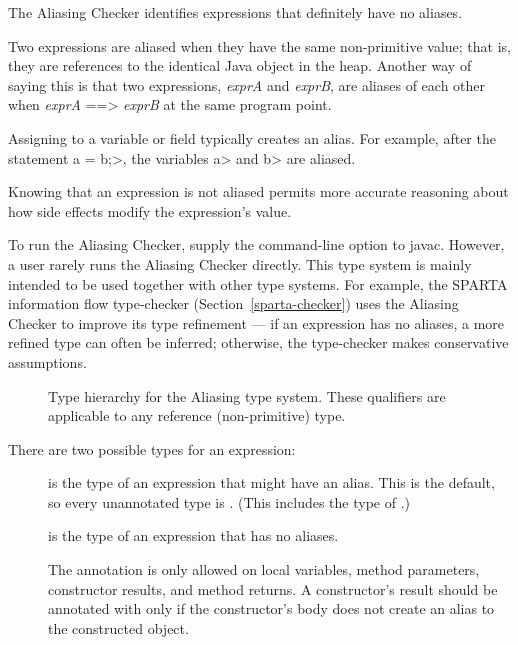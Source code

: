
The Aliasing Checker identifies expressions that definitely have no
aliases.

Two expressions are aliased when they have the same non-primitive value;
that is, they are references to the identical Java object
in the heap. Another way of saying this is that two expressions,
\textit{exprA} and \textit{exprB}, are aliases of each other when
\textit{exprA} \<==> \textit{exprB} at the same program point.

Assigning to a variable or field typically creates an alias.  For example,
after the statement \<a = b;>, the variables \<a> and \<b> are aliased.

Knowing that an expression is not aliased permits more accurate reasoning
about how side effects modify the expression's value.

To run the Aliasing Checker, supply the
command-line option to javac.
However, a user rarely runs the Aliasing Checker directly.
This type system is mainly intended to be used together with other type systems.
For example, the SPARTA information flow type-checker
(Section~\ref{sparta-checker}) uses the Aliasing Checker to improve its
type refinement --- if an expression has no aliases, a more refined type
can often be inferred; otherwise, the type-checker makes conservative
assumptions.


\begin{figure}
\caption{Type hierarchy for the Aliasing type system.
  These qualifiers are applicable to any reference (non-primitive) type.}
\label{fig-aliasing-hierarchy}
\end{figure}

There are two possible types for an expression:

\begin{description}

\item[]
is the type of an expression that might have an alias.
This is the default, so every unannotated type is
. (This includes the type of .)

\item[]
is the type of an expression that has no aliases.

The  annotation is only allowed on local variables, method
parameters, constructor results, and method returns.
A constructor's result should be annotated with  only if the
constructor's body does not create an alias to the constructed object.

\end{description}

